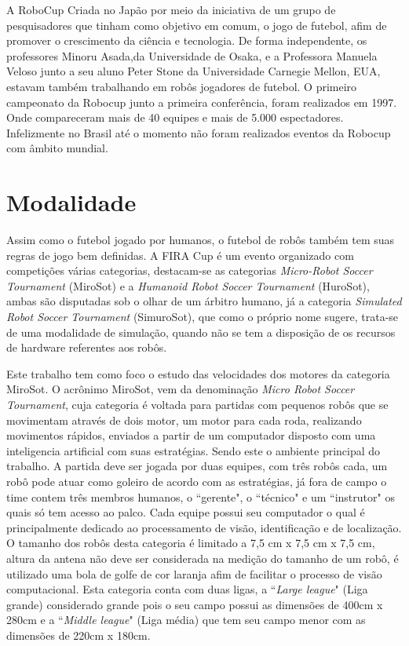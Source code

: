 \documentclass[a4paper,12pt,portuguese]{ufms-cpcx}
\begin{document}
A RoboCup Criada no Japão por meio da iniciativa de um grupo de pesquisadores que tinham como objetivo em comum, o jogo de futebol, afim de promover o crescimento da ciência e tecnologia. De forma independente, os professores Minoru Asada,da Universidade de Osaka, e a Professora Manuela Veloso junto a seu aluno Peter Stone da Universidade Carnegie Mellon, EUA, estavam também trabalhando em robôs jogadores de futebol.
O primeiro campeonato da Robocup junto a primeira conferência, foram realizados em 1997. Onde compareceram mais de 40 equipes e mais de 5.000 espectadores. Infelizmente no Brasil até o momento não foram realizados eventos da Robocup com âmbito mundial.

\section{Modalidade} \label{modalidade}
Assim como o futebol jogado por humanos, o futebol de robôs também tem suas regras de jogo bem definidas. A FIRA Cup é um evento organizado com competições várias categorias, destacam-se as categorias \textit{Micro-Robot Soccer Tournament} (MiroSot) e a \textit{Humanoid Robot Soccer Tournament} (HuroSot), ambas são disputadas sob o olhar de um árbitro humano, já a categoria \textit{Simulated Robot Soccer Tournament} (SimuroSot), que como o próprio nome sugere, trata-se de uma modalidade de simulação, quando não se tem a disposição de os recursos de hardware referentes aos robôs.

Este trabalho tem como foco o estudo das velocidades dos motores da categoria MiroSot. O acrônimo MiroSot, vem da denominação \textit{Micro Robot Soccer Tournament}, cuja categoria é voltada para partidas com pequenos robôs que se movimentam através de dois motor, um motor para cada roda, realizando movimentos rápidos, enviados a partir de um computador disposto com uma inteligencia artificial com suas estratégias. Sendo este o ambiente principal do trabalho.
A partida deve ser jogada por duas equipes, com três robôs cada, um robô pode atuar como goleiro de acordo com as estratégias, já fora de campo o time contem três membros humanos, o ``gerente", o ``técnico" e um ``instrutor" os quais só tem acesso ao palco. Cada equipe possui seu computador o qual é principalmente dedicado ao processamento de visão, identificação e de localização.  
O tamanho dos robôs desta categoria é limitado a 7,5 cm x 7,5 cm x 7,5 cm, altura da antena não deve ser considerada na medição do tamanho de um robô, é utilizado uma bola de golfe de cor laranja afim de facilitar o processo de visão computacional.
Esta categoria conta com duas ligas, a ``\textit{Large league}" (Liga grande) considerado grande pois o seu campo possui as dimensões de 400cm x 280cm e a ``\textit{Middle league}" (Liga média) que tem seu campo menor com as dimensões de 220cm x 180cm.
\end{document}
